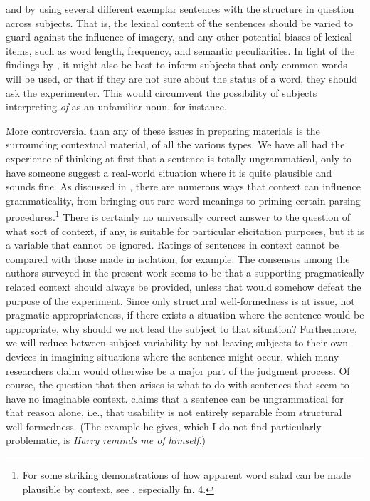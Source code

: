   and by using several different exemplar sentences with the structure in question across subjects. That is, the lexical content of the sentences should be varied to guard against the influence of imagery, and any other potential biases of lexical items, such as word length, frequency, and semantic peculiarities. In light of the findings by \citet{Hill1961}, it might also be best to inform subjects
 that only common words will be used, or that if they are not sure about the status of a word, they should ask the experimenter. This would circumvent the possibility of subjects interpreting \textit{of} as an unfamiliar noun, for instance.

 More controversial than any of these issues in preparing materials is the surrounding contextual material, of all the various types. We have all had the experience of thinking at first that a sentence is totally ungrammatical, only to have someone suggest a real-world situation where it is quite plausible and sounds fine. As discussed in , there are numerous ways that context can influence grammaticality, from bringing out rare word meanings to priming certain parsing procedures.\footnote{For some striking demonstrations of how apparent word salad can be made plausible by context, see \citet{Hill1961}, especially fn. 4.}
  There is certainly no universally correct answer to the question of what sort of context, if any, is suitable for particular elicitation purposes, but it is a variable that cannot be ignored. Ratings of sentences in context cannot be compared with those made in isolation, for example. The consensus among the authors surveyed in the present work seems to be that a supporting pragmatically related context should always be provided, unless that would somehow defeat the purpose of the experiment. Since only structural well-formedness is at issue, not pragmatic appropriateness, if there exists a situation where the sentence would be appropriate, why should we not lead the subject to that situation? Furthermore, we will reduce between-subject variability by not leaving subjects to their own devices in imagining situations where the sentence might occur, which many researchers claim would otherwise be a major part of the judgment process. Of course, the question that then arises is what to do with sentences that seem to have no imaginable context. \citet{Householder1973} claims that a sentence can be ungrammatical for that reason alone, i.e., that usability is not entirely separable from structural well-formedness. (The example he gives, which I do not find particularly problematic, is \textit{Harry reminds me of himself}.)

